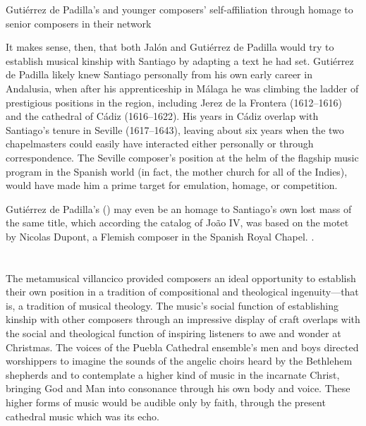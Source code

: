 {Gutiérrez de Padilla's  and younger composers' self-affiliation
through homage to senior composers in their network}

It makes sense, then, that both Jalón and Gutiérrez de Padilla would try to
establish musical kinship with Santiago by adapting a text he had set.
Gutiérrez de Padilla likely knew Santiago personally from his own early career
in Andalusia, when after his apprenticeship in Málaga he was climbing the
ladder of prestigious positions in the region, including Jerez de la Frontera
(1612--1616) and the cathedral of Cádiz (1616--1622).%
    \Autocite{Gembero:Padilla}
His years in Cádiz overlap with Santiago's tenure in Seville (1617--1643),
leaving about six years when the two chapelmasters could easily have interacted
either personally or through correspondence.
The Seville composer's position at the helm of the flagship music
program in the Spanish world (in fact, the mother church for all of the Indies),
would have made him a prime target for emulation, homage, or competition.%
\begin{Footnote}
    Gutiérrez de Padilla's 
    () may even be an homage to Santiago's own lost
    mass of the same title, which according the catalog of João IV, was based
    on the motet  by Nicolas Dupont, a Flemish
    composer in the Spanish Royal Chapel.
    \Autocites 
    [417, caixão 34, : ]
    {JohnIV:Catalog}
    [381, caixão 32, : ] 
    {JohnIV:Catalog}.
\end{Footnote}

\section{}

The metamusical villancico provided composers an ideal opportunity to establish
their own position in a tradition of compositional and theological
ingenuity---that is, a tradition of musical theology.
The music's social function of establishing kinship with other composers through
an impressive display of craft overlaps with the social and theological function
of inspiring listeners to awe and wonder at Christmas.
The voices of the Puebla Cathedral ensemble's men and boys directed worshippers
to imagine the sounds of the angelic choirs heard by the Bethlehem shepherds
and to contemplate a higher kind of music in the incarnate Christ, bringing God
and Man into consonance through his own body and voice.
These higher forms of music would be audible only by faith, through the present
cathedral music which was its echo.

